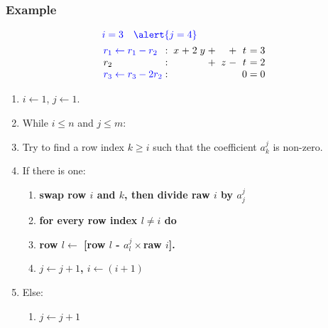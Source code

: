 \documentclass{beamer}
\begin{document}
\begin{frame}
  \frametitle{Example}
  
  \[\arraycolsep=1.4pt
  \begin{aligned}
    &{\color{blue} i = 3 \quad \alert{j = 4}}\\
      &
    \begin{array}{lcccccccccccccc}
        {\color{blue}r_1 \leftarrow r_1 - r_2}  & : &  & x & + & 2 & y & + &  &  & + &  & t & = & 3\\
        r_2 & : &   &   &  &   &  & + &  & z & - &  & t  & = & 2\\
        {\color{blue}r_3 \leftarrow r_3 - 2r_2}  & : &  &   &  &  &   &  &  &  &  &  & 0 & = & 0\\
    \end{array}
  \end{aligned}
  \]
  
  
  \begin{enumerate}
  \item $i \leftarrow 1$, $j \leftarrow 1$.
  \item While $i \le n$ and $j \le m$:
  \item Try to find a row index $k \ge i$ such that the coefficient $a^j_k$ is non-zero.
  \item If there is one:
    \begin{enumerate}
    \item {\bf swap row $i$ and $k$, then divide raw $i$ by $a^{j}_j$}
    \item {\bf for every row index $l \neq i$ do}
    \item {\bf row $l \leftarrow$ [row $l$ - $a^j_l\times$raw $i$].}
    \item {\bf $j \leftarrow j+1$, $i \leftarrow (i+1)$}
    \end{enumerate}
  \item Else:
    \begin{enumerate}
    \item $j \leftarrow j+1$
    \end{enumerate}
  \end{enumerate}
  
\end{frame}
\end{document}
